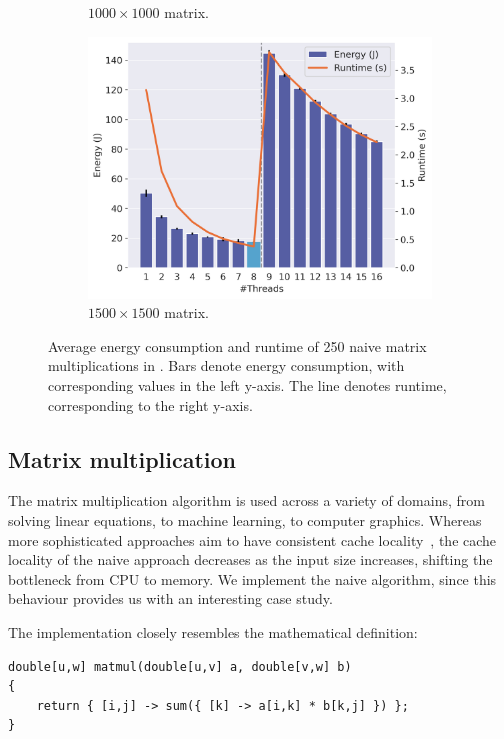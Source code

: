 \begin{figure}[!ht]
\begin{subfigure}{0.33\linewidth}
        \caption{$1000 \times 1000$ matrix.}
        \label{fig:matmul2}
    \end{subfigure}%
    \begin{subfigure}{0.33\linewidth}
        \includegraphics[width=\linewidth]{images/matmul_1500.png}
        \caption{$1500 \times 1500$ matrix.}
        \label{fig:matmul3}
    \end{subfigure}%
    \caption{Average energy consumption and runtime of 250 naive matrix multiplications in \sac{}.
    Bars denote energy consumption, with corresponding values in the left y-axis.
    The line denotes runtime, corresponding to the right y-axis.}
    \label{fig:matmul}
\end{figure}

\subsection{Matrix multiplication}

The matrix multiplication algorithm is used across a variety of domains, from solving linear equations, to machine learning, to computer graphics.
Whereas more sophisticated approaches aim to have consistent cache locality~\cite{sac-blocking}, the cache locality of the naive approach decreases as the input size increases, shifting the bottleneck from CPU to memory.
We implement the naive algorithm, since this behaviour provides us with an interesting case study.

The \sac{} implementation closely resembles the mathematical definition:

\begin{verbatim}
double[u,w] matmul(double[u,v] a, double[v,w] b)
{
    return { [i,j] -> sum({ [k] -> a[i,k] * b[k,j] }) };
}
\end{verbatim}

